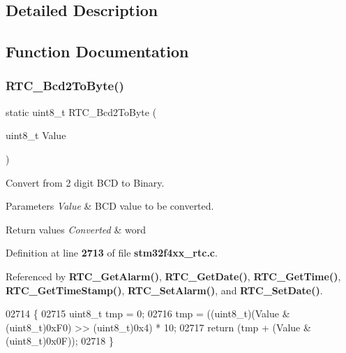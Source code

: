\subsection{Detailed Description}


\subsection{Function Documentation}
\mbox{\label{group__RTC__Private__Functions_ga39e7c20215c2f546a20cf5df25c72d72}} 
\subsubsection{R\+T\+C\+\_\+\+Bcd2\+To\+Byte()}
{\footnotesize\ttfamily static uint8\+\_\+t R\+T\+C\+\_\+\+Bcd2\+To\+Byte (\begin{DoxyParamCaption}\item[{uint8\+\_\+t}]{Value }\end{DoxyParamCaption})\hspace{0.3cm}{\ttfamily [static]}}



Convert from 2 digit B\+CD to Binary. 


\begin{DoxyParams}{Parameters}
{\em Value} & B\+CD value to be converted. \\
\hline
\end{DoxyParams}

\begin{DoxyRetVals}{Return values}
{\em Converted} & word \\
\hline
\end{DoxyRetVals}


Definition at line \textbf{ 2713} of file \textbf{ stm32f4xx\+\_\+rtc.\+c}.



Referenced by \textbf{ R\+T\+C\+\_\+\+Get\+Alarm()}, \textbf{ R\+T\+C\+\_\+\+Get\+Date()}, \textbf{ R\+T\+C\+\_\+\+Get\+Time()}, \textbf{ R\+T\+C\+\_\+\+Get\+Time\+Stamp()}, \textbf{ R\+T\+C\+\_\+\+Set\+Alarm()}, and \textbf{ R\+T\+C\+\_\+\+Set\+Date()}.


\begin{DoxyCode}
02714 \{
02715   uint8\_t tmp = 0;
02716   tmp = ((uint8\_t)(Value & (uint8\_t)0xF0) >> (uint8\_t)0x4) * 10;
02717   \textcolor{keywordflow}{return} (tmp + (Value & (uint8\_t)0x0F));
02718 \}
\end{DoxyCode}
\mbox{\label{group__RTC__Private__Functions_ga020add50c73f0a08516fef0eeee8cca9}} 
